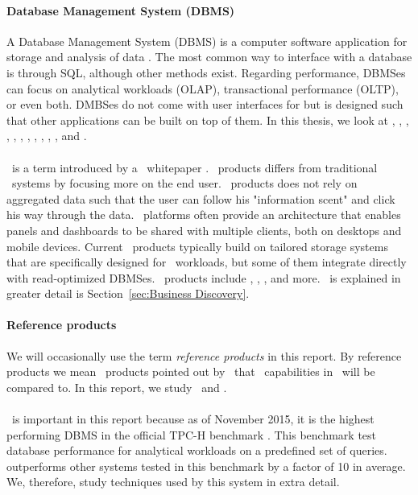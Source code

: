 \paragraph{Database Management System (DBMS)}
\label{par:Database Management System (DBMS)}
A Database Management System (DBMS) is a computer software application for storage and analysis of data \cite{Wikipedia_contributors2015-pb}. The most common way to interface with a database is through SQL, although other methods exist. Regarding performance, DBMSes can focus on analytical workloads (OLAP), transactional performance (OLTP), or even both. DMBSes do not come with user interfaces for \bd but is designed such that other applications can be built on top of them. In this thesis, we look at \oracle, \ibm, \saph, \sapnw, \mssql, \cstore, \vertica, \blink, \exasol, \oracle, \hyper, and \hyrise.

\paragraph{\bd}
\label{par:Business Discovery}
\bd~is a term introduced by a \qlikview~whitepaper \cite{Qlik2014-vd}. \bd~products differs from traditional \bi~systems by focusing more on the end user. \bd~products does not rely on aggregated data such that the user can follow his "information scent" and click his way through the data. \bd~platforms often provide an architecture that enables panels and dashboards to be shared with multiple clients, both on desktops and mobile devices. Current \bd~products typically build on tailored storage systems that are specifically designed for \bd~workloads, but some of them integrate directly with read-optimized DBMSes. \bd~products include \tableau, \qlikview, \powerpivot, and more. \bd~is explained in greater detail is Section~\ref{sec:Business Discovery}.

\paragraph{Reference products}
\label{par:Reference products}
We will occasionally use the term \textit{reference products} in this report. By reference products we mean \bd~products pointed out by \genus~that \bd~capabilities in \genusSoftware~will be compared to. In this report, we study \qlikview~and \tableau.

\paragraph{\exasol}
\label{par:exasol}
\exasol~is important in this report because as of November 2015, it is the highest performing DBMS in the official TPC-H benchmark \cite{noauthor_undated-vr}. This benchmark test database performance for analytical workloads on a predefined set of queries. \exasol outperforms other systems tested in this benchmark by a factor of 10 in average. We, therefore, study techniques used by this system in extra detail.



